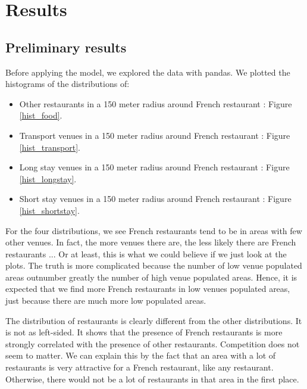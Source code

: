 \documentclass[12pt,a4paper]{article}
\begin{document}
\section{Results}

\subsection{Preliminary results}

Before applying the model, we explored the data with pandas. We plotted the histograms of the distributions of:

\begin{itemize}

	\item Other restaurants in a 150 meter radius around French restaurant : Figure \ref{hist_food}.
	\item Transport venues in a 150 meter radius around French restaurant : Figure \ref{hist_transport}.
	\item Long stay venues in a 150 meter radius around French restaurant : Figure \ref{hist_longstay}.
	\item Short stay venues in a 150 meter radius around French restaurant : Figure \ref{hist_shortstay}.

\end{itemize}

For the four distributions, we see French restaurants tend to be in areas with few other venues. 
In fact, the more venues there are, the less likely there are French restaurants ... Or at least, this is what we could believe if we just look at the plots. The truth is more complicated because the number of low venue populated areas outnumber greatly the number of high venue populated areas. Hence, it is expected that we find more French restaurants in low venues populated areas, just because there are much more low populated areas.

\medskip

The distribution of restaurants is clearly different from the other distributions. It is not as left-sided. It shows that the presence of French restaurants is more strongly correlated with the presence of other restaurants. Competition does not seem to matter. We can explain this by the fact that an area with a lot of restaurants is very attractive for a French restaurant, like any restaurant. Otherwise, there would not be a lot of restaurants in that area in the first place. 

\medskip
\end{document}
